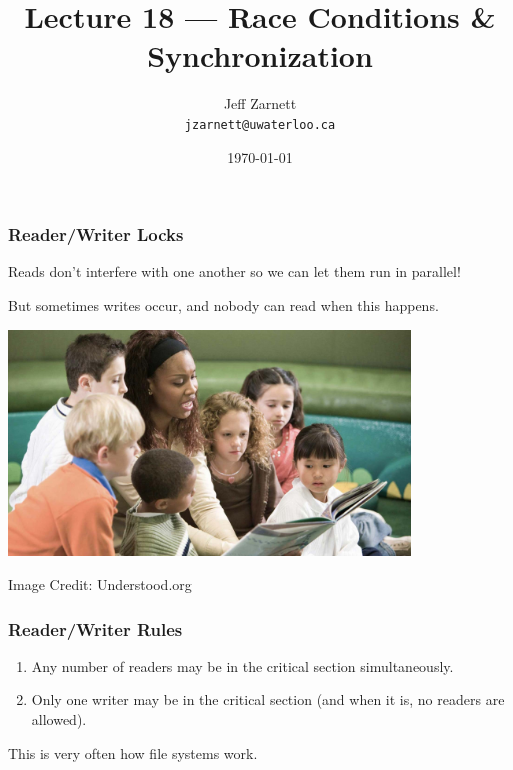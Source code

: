 
\usepackage{multirow}

\title{Lecture 18 --- Race Conditions \& Synchronization }

\author{Jeff Zarnett \\ \small \texttt{jzarnett@uwaterloo.ca}}
\date{\today}




\begin{frame}
  \titlepage

 \end{frame}

\begin{frame}
\frametitle{Reader/Writer Locks}
Reads don't interfere with one another so we can let them run in parallel!

But sometimes writes occur, and nobody can read when this happens.

\begin{center}
	\includegraphics[width=0.8\textwidth]{images/groupreading.jpg}
\end{center}
\hfill Image Credit: Understood.org
\end{frame}

\begin{frame}
\frametitle{Reader/Writer Rules}


\begin{enumerate}
\item Any number of readers may be in the critical section simultaneously.
\item Only one writer may be in the critical section (and when it is, no readers are allowed).
\end{enumerate}


This is very often how file systems work.

\end{frame}


